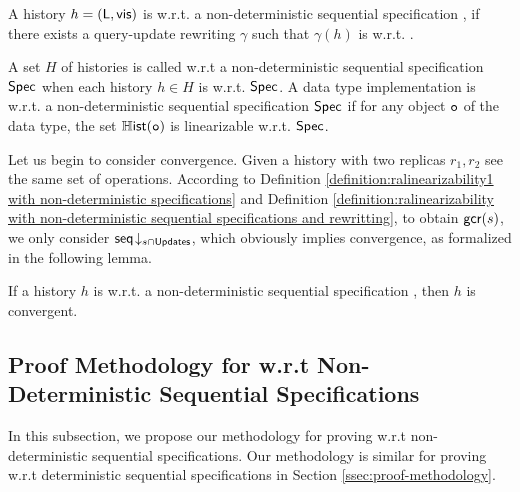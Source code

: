 {\begin{definition}
\label{definition:ralinearizability with non-deterministic sequential specifications and rewritting}
A history $h =(\mathsf{L},\mathsf{vis})$ is \crdtlinearizable{} w.r.t. a non-deterministic sequential specification \Spec{}, if there exists a query-update rewriting $\gamma$ such that $\gamma(h)$ is \crdtlinearizable{} w.r.t. \Spec{}.
\end{definition}

A set $H$ of histories is called \crdtlinearizable{} w.r.t a non-deterministic sequential specification $\mathsf{Spec}$ when each history $h\in H$ is \crdtlinearizable{} w.r.t. $\mathsf{Spec}$. A data type implementation is \crdtlinearizable{} w.r.t. a non-deterministic sequential specification $\mathsf{Spec}$ if for any object $\mathtt{o}$ of the data type, the set $\mathbb{H}\mathsf{ist}(\mathtt{o})$ is linearizable w.r.t. $\mathsf{Spec}$.

Let us begin to consider convergence. Given a \crdtlinearizable{} history with two replicas $r_1,r_2$ see the same set of operations. According to Definition \ref{definition:ralinearizability1 with non-deterministic specifications} and Definition \ref{definition:ralinearizability with non-deterministic sequential specifications and rewritting}, to obtain $\mathsf{gcr}(s)$, we only consider $\mathsf{seq}\!\downarrow_{s\cap \mathsf{Updates}}$, which obviously implies convergence, as formalized in the following lemma.

\begin{lemma}
\label{lemma:distributed linarizability implies convergence for non-deterministic sequential specifications}
If a history $h$ is \crdtlinearizable{} w.r.t. a non-deterministic sequential specification \Spec, then $h$ is convergent.
\end{lemma}






\subsection{Proof Methodology for \crdtlin{} w.r.t Non-Deterministic Sequential Specifications}
\label{subsec:appendix proof methodology for RA-linearizability w.r.t non-deterministic sequential specifications}

In this subsection, we propose our methodology for proving \crdtlin{} w.r.t non-deterministic sequential specifications. Our methodology is similar for proving \crdtlin{} w.r.t deterministic sequential specifications in Section \ref{ssec:proof-methodology}.

}
